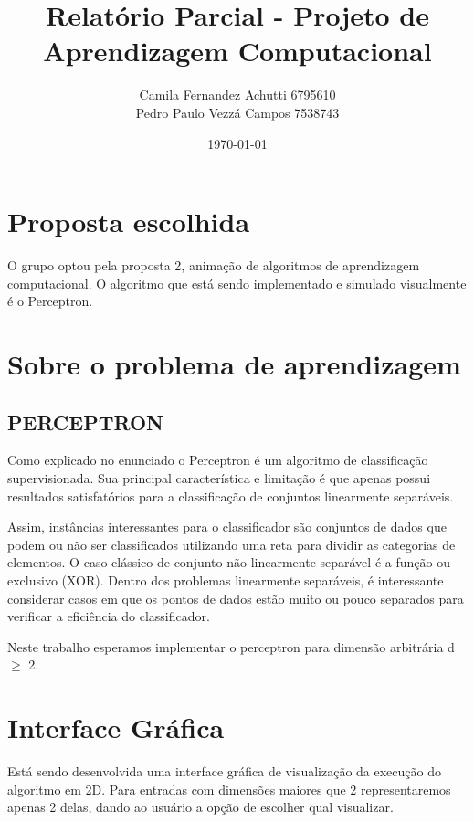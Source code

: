 \documentclass[brazil, a4paper]{article}
\begin{document}
\title{Relatório Parcial - Projeto de Aprendizagem Computacional}
\author{Camila Fernandez Achutti \hfill 6795610\\
		Pedro Paulo Vezzá Campos \hfill 7538743}
\date{\today}

\maketitle



\section{Proposta escolhida}
O grupo optou pela proposta 2, animação de algoritmos de aprendizagem
computacional. O algoritmo que está sendo implementado e simulado visualmente é o
Perceptron.

\section{Sobre o problema de aprendizagem}
\subsection{PERCEPTRON}
Como explicado no enunciado o Perceptron é um algoritmo de classificação 
supervisionada. Sua principal característica e limitação é que apenas possui 
resultados satisfatórios para a classificação de conjuntos linearmente
separáveis.

Assim, instâncias interessantes para o classificador são conjuntos de dados que
podem ou não ser classificados utilizando uma reta para dividir as categorias
de elementos. O caso clássico de conjunto não linearmente separável é a
função ou-exclusivo (XOR). Dentro dos problemas linearmente separáveis,
é interessante considerar casos em que os pontos de dados estão muito ou
pouco separados para verificar a eficiência do classificador.

Neste trabalho esperamos implementar o perceptron para dimensão arbitrária d $\ge$ 2.

\section{Interface Gráfica}

Está sendo desenvolvida uma interface gráfica de visualização da execução do
algoritmo em 2D. Para entradas com dimensões maiores que 2 representaremos
apenas 2 delas, dando ao usuário a opção de escolher qual visualizar.
\end{document}
